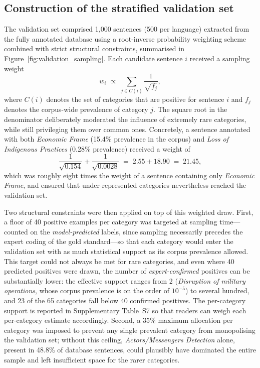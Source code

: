 \documentclass[12pt]{article}
\renewcommand\_{\texttt{\detokenize{_}\allowbreak}}
\begin{document}
\subsection{Construction of the stratified validation set}

The validation set comprised 1,000 sentences (500 per language) extracted from the fully annotated database using a root-inverse probability weighting scheme combined with strict structural constraints, summarised in Figure~\ref{fig:validation_sampling}. Each candidate sentence $i$ received a sampling weight
\begin{equation}
    w_i \;\propto\; \sum_{j \in C(i)} \frac{1}{\sqrt{f_j}},
\end{equation}
where $C(i)$ denotes the set of categories that are positive for sentence $i$ and $f_j$ denotes the corpus-wide prevalence of category $j$. The square root in the denominator deliberately moderated the influence of extremely rare categories, while still privileging them over common ones. Concretely, a sentence annotated with both \textit{Economic Frame} (15.4\% prevalence in the corpus) and \textit{Loss of Indigenous Practices} (0.28\% prevalence) received a weight of
\begin{equation*}
    \frac{1}{\sqrt{0.154}} + \frac{1}{\sqrt{0.0028}} \;=\; 2.55 + 18.90 \;=\; 21.45,
\end{equation*}
which was roughly eight times the weight of a sentence containing only \textit{Economic Frame}, and ensured that under-represented categories nevertheless reached the validation set.

Two structural constraints were then applied on top of this weighted draw. First, a floor of 40 positive examples per category was targeted at sampling time---counted on the \emph{model-predicted} labels, since sampling necessarily precedes the expert coding of the gold standard---so that each category would enter the validation set with as much statistical support as its corpus prevalence allowed. This target could not always be met for rare categories, and even where 40 predicted positives were drawn, the number of \emph{expert-confirmed} positives can be substantially lower: the effective support ranges from 2 (\textit{Disruption of military operations}, whose corpus prevalence is on the order of $10^{-5}$) to several hundred, and 23 of the 65 categories fall below 40 confirmed positives. The per-category support is reported in Supplementary Table~S7 so that readers can weigh each per-category estimate accordingly. Second, a 35\% maximum allocation per category was imposed to prevent any single prevalent category from monopolising the validation set; without this ceiling, \textit{Actors/Messengers Detection} alone, present in 48.8\% of database sentences, could plausibly have dominated the entire sample and left insufficient space for the rarer categories.
\end{document}
